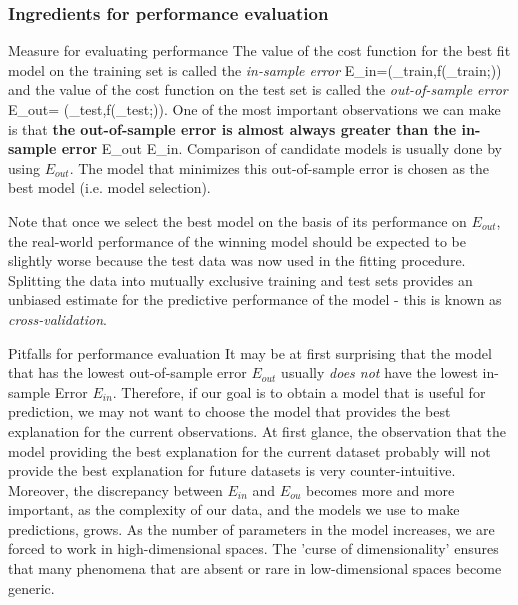\subsubsection{Ingredients for performance evaluation}
\begin{mybox}{Measure for evaluating performance}
	The value of the cost function for the best fit model on the training set is called the \emph{in-sample error}
	\be 
	\label{eq:errorInsample}
	E_{in}=\mC(\my_{train},f(\mX_{train};\mt))
	\ee 
	and the value of the cost function on the test set is called the \emph{out-of-sample error}
	\be 
	\label{eq:errorOutsample}
	E_{out}= \mC(\my_{test},f(\mX_{test};\mt)).
	\ee 
	One of the most important observations we can make is that \textbf{the out-of-sample error is almost always greater than the in-sample error}
	\be 
	\label{eq:errorComparison}
	E_{out} \geq E_{in}.
	\ee 
	Comparison of candidate models is usually done by using $E_{out}$. The model that minimizes this out-of-sample error is chosen as the best model (i.e. model selection).
\end{mybox}
Note that once we select the best model on the basis of its performance on $E_{out}$, the real-world performance of the winning model should be expected to be slightly worse because the test data was now used in the fitting procedure.\\
Splitting the data into mutually exclusive training and test sets provides an unbiased estimate for the predictive performance of the model - this is known as \emph{cross-validation}.
\begin{mybox}{Pitfalls for performance evaluation}
	It may be at first surprising that the model that has the lowest out-of-sample error $E_{out}$ usually \emph{does not} have the lowest in-sample Error $E_{in}$. Therefore, if our goal is to obtain a model that is useful for prediction, we may not want to choose the model that provides the best explanation for the current observations. At first glance, the observation that the model providing the best explanation for the current dataset probably will not provide the best explanation for future datasets is very counter-intuitive. \\
Moreover, the discrepancy between $E_{in}$ and $E_{ou}$ becomes more and more important, as the complexity of our data, and the models we use to make predictions, grows. As the number of parameters in the model increases, we are forced to work in high-dimensional spaces. The ’curse of dimensionality’ ensures that many phenomena that are absent or rare in low-dimensional spaces become generic.
\end{mybox}
